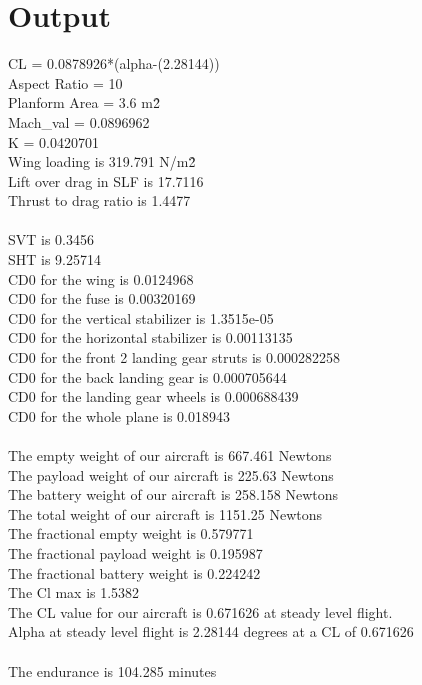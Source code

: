 \documentclass[12pt,A4paper]{article}
\begin{document}
	\section{Output}
	CL = 0.0878926*(alpha-(2.28144)) \\
	Aspect Ratio = 10 \\
	Planform Area = 3.6 m\^2 \\
	Mach\_val = 0.0896962 \\
	K = 0.0420701 \\
	Wing loading is 319.791 N/m\^2  \\
	Lift over drag in SLF is 17.7116  \\
	Thrust to drag ratio is 1.4477  \\
	\\
	SVT is 0.3456\\
	SHT is 9.25714\\
	CD0 for the wing is 0.0124968\\
	CD0 for the fuse is 0.00320169\\
	CD0 for the vertical stabilizer is 1.3515e-05\\
	CD0 for the horizontal stabilizer is 0.00113135\\
	CD0 for the front 2 landing gear struts is 0.000282258\\
	CD0 for the back landing gear is 0.000705644\\
	CD0 for the landing gear wheels is 0.000688439\\
	CD0 for the whole plane is 0.018943\\
	\\
	The empty weight of our aircraft is 667.461 Newtons \\
	The payload weight of our aircraft is 225.63 Newtons \\
	The battery weight of our aircraft is 258.158 Newtons \\
	The total weight of our aircraft is 1151.25 Newtons \\
	The fractional empty weight is 0.579771 \\
	The fractional payload weight is 0.195987 \\
	The fractional battery weight is 0.224242 \\
	The Cl max is 1.5382 \\
	The CL value for our aircraft is 0.671626 at steady level flight. \\
	Alpha at steady level flight is 2.28144 degrees at a CL of 0.671626 \\
	\\
	The endurance is 104.285 minutes \\
\end{document}
